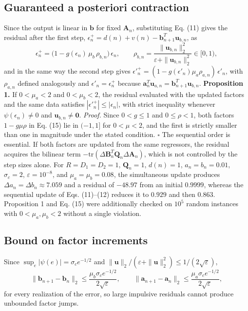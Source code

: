 \documentclass[preprint,12pt]{elsarticle}
\begin{document}
\subsection{Guaranteed a posteriori contraction}
Since the output is linear in $\mathbf{b}$ for fixed $\mathbf{A}_n$, substituting Eq. (11) gives the residual after the first step, $\epsilon_n^{+} = d(n) + v(n) - \mathbf{b}_{n+1}^T\mathbf{u}_{b,n}$, as
\begin{equation}
\epsilon_n^{+} = \big(1 - g(\epsilon_n)\,\mu_b\,\rho_{b,n}\big)\,\epsilon_n, \qquad \rho_{b,n} = \frac{\|\mathbf{u}_{b,n}\|_2^2}{\varepsilon + \|\mathbf{u}_{b,n}\|_2^2} \in [0, 1), \tag{15}
\end{equation}
and in the same way the second step gives $\epsilon'^{+}_n = (1 - g(\epsilon'_n)\mu_a\rho_{a,n})\,\epsilon'_n$, with $\rho_{a,n}$ defined analogously and $\epsilon'_n = \epsilon_n^{+}$ because $\mathbf{a}_n^T\mathbf{u}_{a,n} = \mathbf{b}_{n+1}^T\mathbf{u}_{b,n}$.
\textbf{Proposition 1.} If $0 < \mu_a < 2$ and $0 < \mu_b < 2$, the residual evaluated with the updated factors and the same data satisfies $|\epsilon'^{+}_n| \le |\epsilon_n|$, with strict inequality whenever $\psi(\epsilon_n) \ne 0$ and $\mathbf{u}_{b,n} \ne \mathbf{0}$.
\emph{Proof.} Since $0 < g \le 1$ and $0 \le \rho < 1$, both factors $1 - g\mu\rho$ in Eq. (15) lie in $(-1, 1]$ for $0 < \mu < 2$, and the first is strictly smaller than one in magnitude under the stated condition. $\square$
The sequential order is essential. If both factors are updated from the same regressors, the residual acquires the bilinear term $-\mathrm{tr}(\Delta\mathbf{B}_n^T\mathbf{Q}_n\Delta\mathbf{A}_n)$, which is not controlled by the step sizes alone. For $R = D_1 = D_2 = 1$, $\mathbf{Q}_n = 1$, $d(n) = 1$, $a_n = b_n = 0.01$, $\sigma_c = 2$, $\varepsilon = 10^{-8}$, and $\mu_a = \mu_b = 0.08$, the simultaneous update produces $\Delta a_n = \Delta b_n \approx 7.059$ and a residual of $-48.97$ from an initial $0.9999$, whereas the sequential update of Eqs. (11)–(12) reduces it to $0.929$ and then $0.863$. Proposition 1 and Eq. (15) were additionally checked on $10^5$ random instances with $0 < \mu_a, \mu_b < 2$ without a single violation.
\subsection{Bound on factor increments}
Since $\sup_e |\psi(e)| = \sigma_c e^{-1/2}$ and $\|\mathbf{u}\|_2 / (\varepsilon + \|\mathbf{u}\|_2^2) \le 1/(2\sqrt{\varepsilon})$,
\begin{equation}
\|\mathbf{b}_{n+1} - \mathbf{b}_n\|_2 \le \frac{\mu_b\sigma_c e^{-1/2}}{2\sqrt{\varepsilon}}, \qquad
\|\mathbf{a}_{n+1} - \mathbf{a}_n\|_2 \le \frac{\mu_a\sigma_c e^{-1/2}}{2\sqrt{\varepsilon}}, \tag{16}
\end{equation}
for every realization of the error, so large impulsive residuals cannot produce unbounded factor jumps.
\end{document}
